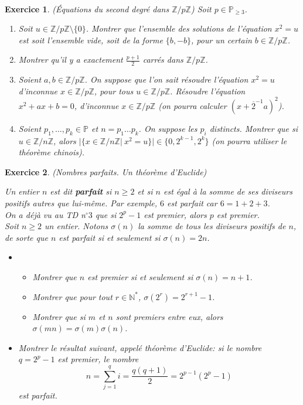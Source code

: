 \documentclass[11pt,a4paper]{article}
\newtheorem{ex}{Exercice}
\newcommand{\Z}{\mathbb{Z}}
\begin{document}
\


\begin{ex}\label{exEquation_degre_2_F_p}(Équations du second degré dans $\Z/p\Z$)
Soit $p\in \mathbb{P}_{\geq 3}$. 
\begin{enumerate}
\item Soit $u\in \Z/p\Z\setminus\{0\}$. Montrer que l'ensemble des solutions de l'équation $x^2=u$ est soit l'ensemble vide, soit de la forme $\{b,-b\}$, pour un certain $b\in \Z/p\Z$.

\item Montrer qu'il y a exactement $\frac{p+1}{2}$ carrés dans $\Z/p\Z$.

\item Soient $a,b\in \Z/p\Z$. On suppose que l'on sait résoudre l'équation $x^2=u$ d'inconnue $x\in \Z/p\Z$, pour 
tous $u\in \Z/p\Z$. Résoudre l'équation $x^2+ax+b=0$, d'inconnue $x\in \Z/p\Z$ (on pourra calculer $(x+\overline{2}^{-1} a)^2$). 

\item Soient $p_1,\ldots,p_k\in \mathbb{P}$ et $n=p_1\ldots p_k$. On suppose les $p_i$ distincts. Montrer que si $u\in \Z/n\Z$, alors $|\{x\in \Z/n\Z|\ x^2=u\}|\in \{0,2^{k-1},2^k\}$ (on pourra utiliser le théorème  chinois). 

\end{enumerate}

\end{ex}



\begin{ex}(Nombres parfaits. Un théorème d'Euclide)\

Un entier $n$ est dit \textbf{parfait} si $n \geqslant 2$ et si $n$ est égal à la somme de ses diviseurs positifs autres que lui-même. Par exemple, $6$ est parfait car $6=1+2+3$. \\
On a déjà vu au TD n$^{\circ}3$ que si $2^p-1$ est premier, alors $p$ est premier. \\
Soit $n\geqslant 2$ un entier. Notons $\sigma(n)$ la somme de tous les diviseurs positifs de $n$, de sorte que $n$ est parfait si et seulement si $\sigma(n)=2n$.
\begin{itemize}
\item[$1.$]\begin{itemize}
\item[$a)$] Montrer que $n$ est premier si et seulement si $\sigma(n)=n+1$.
\item[$b)$] Montrer que pour tout $r \in \mathbb{N}^*$, $\sigma(2^r)=2^{r+1}-1$.
\item[$c)$] Montrer que si $m$ et $n$ sont premiers entre eux, alors $\sigma(mn)=\sigma(m)\sigma(n)$.
\end{itemize}
\item[$2.$] Montrer le résultat suivant, appelé théorème d'Euclide: si le nombre $q=2^p-1$ est premier, le nombre
$$ n=\sum_{j=1}^q i=\frac{q(q+1)}{2}=2^{p-1}(2^p-1) $$
est parfait.
\end{itemize}
\end{ex}
\end{document}
